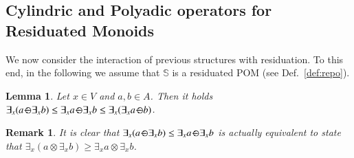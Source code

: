 \documentclass[preprint,12pt]{elsarticle}
\newtheorem{remark}{Remark}
\newtheorem{lemma}{Lemma}
\def\monop{\otimes}
\def\odiv{\, {\ominus\hspace{-7.7pt} \div} \,}
\begin{document}


\subsection{Cylindric and Polyadic operators for Residuated Monoids}
\label{cyre}
We now consider 
the interaction of previous structures with residuation. 
%
To this end, in the following we assume that 
$\mathbb{S}$ is a residuated POM (see Def.~\ref{def:repo}).


\begin{lemma}
	\label{divex}
	Let $x \in V$ and $a, b \in A$.
	Then it holds
	$\exists_x(a \odiv \exists_x b) \leq \exists_x a \odiv \exists_x b \leq
	\exists_x(\exists_x a \odiv b)$.
\end{lemma}



\begin{remark}
	\label{remdiv}
	It is clear that $\exists_x(a \odiv \exists_x b) \leq \exists_x a \odiv \exists_x b$
	is actually equivalent to state that
	$\exists_x(a \monop \exists_x b) \geq \exists_x a \monop \exists_x b$.
\end{remark}
\end{document}
